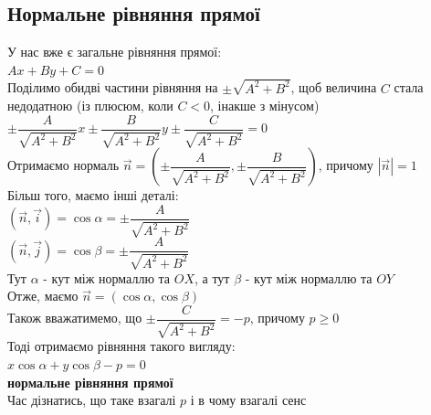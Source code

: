 \documentclass[a4paper, 14pt]{extarticle}
\def\bigline{\vspace{5mm}\\}
\begin{document}
\subsection{Нормальне рівняння прямої}
У нас вже є загальне рівняння прямої:\\
$Ax + By + C = 0$\\
Поділимо обидві частини рівняння на $\pm \sqrt{A^2+B^2}$, щоб величина $C$ стала недодатною (із плюсюм, коли $C<0$, інакше з мінусом)\\
$\pm \dfrac{A}{\sqrt{A^2+B^2}}x \pm \dfrac{B}{\sqrt{A^2+B^2}}y \pm \dfrac{C}{\sqrt{A^2+B^2}} = 0$\\
Отримаємо нормаль $\vec{n} = \left(\pm \dfrac{A}{\sqrt{A^2+B^2}}, \pm \dfrac{B}{\sqrt{A^2+B^2}} \right)$, причому $|\vec{n}| = 1$\\
Більш того, маємо інші деталі:\\
$(\vec{n}, \vec{i}) = \cos \alpha = \pm \dfrac{A}{\sqrt{A^2+B^2}}$\\
$(\vec{n}, \vec{j}) = \cos \beta = \pm \dfrac{A}{\sqrt{A^2+B^2}}$\\
Тут $\alpha$ - кут між нормаллю та $OX$, а тут $\beta$ - кут між нормаллю та $OY$\\
Отже, маємо $\vec{n} = (\cos \alpha, \cos \beta)$\\
Також вважатимемо, що $\pm \dfrac{C}{\sqrt{A^2+B^2}} = -p$, причому $p \geq 0$\\
Тоді отримаємо рівняння такого вигляду:\\
$x \cos \alpha + y \cos \beta - p = 0$\\
\textbf{нормальне рівняння прямої}
\bigline
Час дізнатись, що таке взагалі $p$ і в чому взагалі сенс\\
\\
\end{document}
